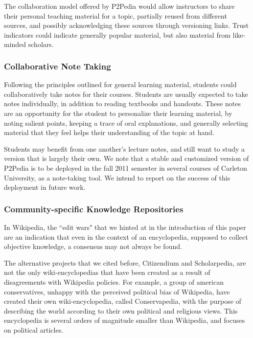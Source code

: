 The collaboration model offered by P2Pedia would allow instructors to share their personal teaching material for a topic, partially reused from different sources, and possibly acknowledging these sources through versioning links. Trust indicators could indicate generally popular material, but also material from like-minded scholars.

\subsubsection{Collaborative Note Taking}
Following the principles outlined for general learning material, students could collaboratively take notes for their courses. Students are usually expected to take notes individually, in addition to reading textbooks and handouts. These notes are an opportunity for the student to personalize their learning material, by noting salient points, keeping a trace of oral explanations, and generally selecting material that they feel helps their understanding of the topic at hand.

Students may benefit from one another's lecture notes, and still want to study a version that is largely their own. We note that a stable and customized version of P2Pedia is to be deployed in the fall 2011 semester in several courses of Carleton University, as a note-taking tool. We intend to report on the success of this deployment in future work.

\subsubsection{Community-specific Knowledge Repositories}

In Wikipedia, the ``edit wars" that we hinted at in the introduction of this paper are an indication that even in the context of an encyclopedia, supposed to collect objective knowledge, a consensus may not always be found.

The alternative projects that we cited before, Citizendium and Scholarpedia, are not the only wiki-encyclopedias that have been created as a result of disagreements with Wikipedia policies. For example, a group of american conservatives, unhappy with the perceived political bias of Wikipedia, have created their own wiki-encyclopedia, called Conservapedia, with the purpose of describing the world according to their own political and religious views. This encyclopedia is several orders of magnitude smaller than Wikipedia, and focuses on political articles. 

